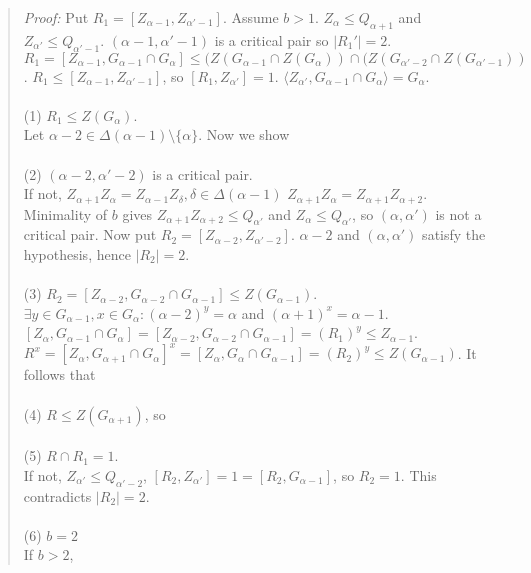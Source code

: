 \begin{quote}
\emph{Proof:}  
Put $R_1= [Z_{\alpha - 1}, Z_{\alpha' - 1}]$.  Assume $b > 1$.
$Z_{\alpha} \leq Q_{\alpha+1}$ and $Z_{\alpha'} \leq Q_{\alpha'-1}$.  $(\alpha - 1, \alpha' - 1)$ is a 
critical pair so $|R_1'| =2$.  
$R_1 = [Z_{\alpha - 1}, G_{\alpha - 1} \cap G_{\alpha}] \leq (Z(G_{\alpha - 1} \cap  Z(G_{\alpha})) 
\cap (Z(G_{\alpha' - 2} \cap  Z(G_{\alpha' - 1}))$.  $R_1 \leq [Z_{\alpha - 1}, Z_{\alpha' - 1}]$, so $[R_1, Z_{\alpha'}] = 1$.
$\langle Z_{\alpha'} , G_{\alpha - 1} \cap G_{\alpha} \rangle = G_{\alpha}$.
\\
\\
(1) $R_1 \leq Z(G_{\alpha})$.
\\
Let $\alpha - 2 \in \Delta(\alpha - 1) \setminus \{ \alpha \}$.  Now we show \\
\\
(2) $(\alpha - 2, \alpha' - 2)$ is a critical pair.\\
If not, $Z_{\alpha + 1} Z_{\alpha} = Z_{\alpha - 1} Z_{\delta}, \delta \in \Delta(\alpha - 1)$
$Z_{\alpha + 1} Z_{\alpha} = Z_{\alpha + 1} Z_{\alpha + 2}$.  Minimality of $b$ gives
$Z_{\alpha + 1} Z_{\alpha + 2} \leq Q_{\alpha'}$ and $Z_{\alpha} \leq Q_{\alpha'}$, so $(\alpha, \alpha')$ is not a critical pair.
Now put $R_2= [Z_{\alpha - 2}, Z_{\alpha' - 2}]$.  $\alpha - 2$ and $(\alpha, \alpha')$ satisfy the hypothesis,
hence $|R_2| = 2$.\\
\\
(3) $R_2 = [Z_{\alpha - 2},  G_{\alpha - 2} \cap G_{\alpha - 1}] \leq Z(G_{\alpha - 1})$.\\
$\exists y \in G_{\alpha - 1}, x \in G_{\alpha} : (\alpha - 2)^y = \alpha$ and $(\alpha + 1)^x = \alpha - 1$.
$[Z_{\alpha}, G_{\alpha - 1} \cap G_{\alpha}] = [Z_{\alpha - 2}, G_{\alpha - 2} \cap G_{\alpha - 1}] = (R_1)^y \leq Z_{\alpha - 1}$.
$R^x = [Z_{\alpha}, G_{\alpha + 1} \cap G_{\alpha}]^x = [Z_{\alpha}, G_{\alpha} \cap G_{\alpha - 1}] = (R_2)^y \leq Z(G_{\alpha - 1})$.
It follows that\\
\\
(4) $ R \leq Z(G_{\alpha + 1})$, so \\
\\
(5) $ R \cap R_1 =1$.\\
If not, $Z_{\alpha'} \leq Q_{\alpha' - 2}$, $[R_2, Z_{\alpha'}] = 1= [R_2, G_{\alpha - 1}]$, so $R_2 =1$.
This contradicts $|R_2|=2$.\\
\\
(6) $b = 2$\\
If $b>2$, 

\end{quote}
